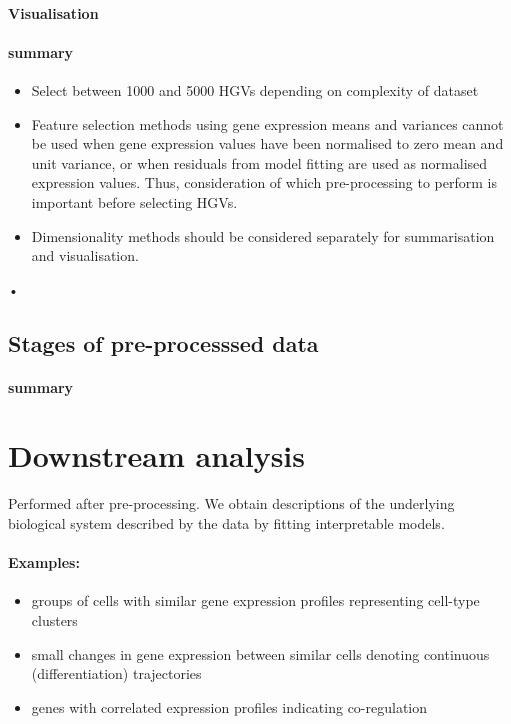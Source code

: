 \documentclass[a4paper,12pt]{article}
\begin{document}
\paragraph{Visualisation}

\paragraph{summary}
\begin{itemize}
\item Select between 1000 and 5000 HGVs depending on complexity of dataset
\item Feature selection methods using gene expression means and variances cannot be used when gene expression values have been normalised to zero mean and unit variance, or when residuals from model fitting are used as normalised expression values. Thus, consideration of which pre-processing to perform is important before selecting HGVs.
\item Dimensionality methods should be considered separately for summarisation and visualisation.




\end{itemize}•

\subsection{Stages of pre-processsed data}

\paragraph{summary}

\section{Downstream analysis}
Performed after pre-processing. We obtain descriptions of the underlying biological system described by the data by fitting interpretable models. 
\paragraph{Examples:}
\begin{itemize}
\item groups of cells with similar gene expression profiles representing cell-type clusters
\item small changes in gene expression between similar cells denoting continuous (differentiation) trajectories
\item genes with correlated expression profiles indicating co-regulation
\end{itemize}
\end{document}
